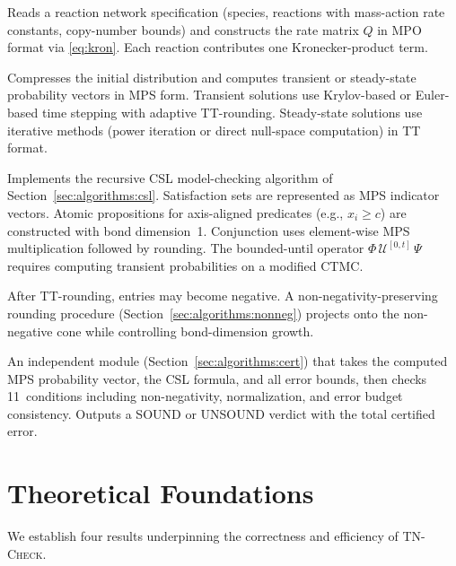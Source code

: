 \documentclass[11pt]{article}
\newcommand{\tncheck}{\textsc{TN-Check}}
\begin{document}
\begin{description}[leftmargin=1em,itemsep=3pt]
\item[Generator.]
  Reads a reaction network specification (species, reactions with
  mass-action rate constants, copy-number bounds) and constructs
  the rate matrix $Q$ in MPO format via \eqref{eq:kron}.
  Each reaction contributes one Kronecker-product term.

\item[TT Compress.]
  Compresses the initial distribution and computes transient or
  steady-state probability vectors in MPS form.
  Transient solutions use Krylov-based or Euler-based time stepping
  with adaptive TT-rounding.
  Steady-state solutions use iterative methods (power iteration
  or direct null-space computation) in TT format.

\item[CSL Checker.]
  Implements the recursive CSL model-checking algorithm of
  Section~\ref{sec:algorithms:csl}.
  Satisfaction sets are represented as MPS indicator vectors.
  Atomic propositions for axis-aligned predicates
  (e.g., $x_i \geq c$) are constructed with bond dimension~1.
  Conjunction uses element-wise MPS multiplication followed by
  rounding.
  The bounded-until operator $\Phi\,\mathcal{U}^{[0,t]}\,\Psi$
  requires computing transient probabilities on a modified CTMC.

\item[Non-negativity Rounding.]
  After TT-rounding, entries may become negative.
  A non-negativity-preserving rounding procedure
  (Section~\ref{sec:algorithms:nonneg}) projects onto the
  non-negative cone while controlling bond-dimension growth.

\item[Certificate Verifier.]
  An independent module (Section~\ref{sec:algorithms:cert}) that
  takes the computed MPS probability vector, the CSL formula, and
  all error bounds, then checks 11~conditions including
  non-negativity, normalization, and error budget consistency.
  Outputs a SOUND or UNSOUND verdict with the total certified error.
\end{description}

\section{Theoretical Foundations}\label{sec:theory}

We establish four results underpinning the correctness and efficiency
of \tncheck{}.
\end{document}
